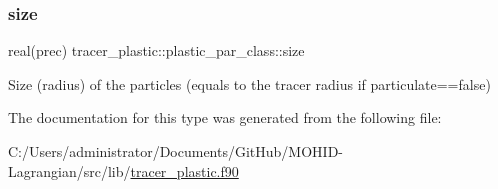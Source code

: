 \mbox{\label{structtracer__plastic_1_1plastic__par__class_ae7f5294e339ec13e0d5f0213fe66e026}} 
\subsubsection{\texorpdfstring{size}{size}}
{\footnotesize\ttfamily real(prec) tracer\+\_\+plastic\+::plastic\+\_\+par\+\_\+class\+::size\hspace{0.3cm}{\ttfamily [private]}}



Size (radius) of the particles (equals to the tracer radius if particulate==false) 



The documentation for this type was generated from the following file\+:\begin{DoxyCompactItemize}
\item 
C\+:/\+Users/administrator/\+Documents/\+Git\+Hub/\+M\+O\+H\+I\+D-\/\+Lagrangian/src/lib/\hyperlink{tracer__plastic_8f90}{tracer\+\_\+plastic.\+f90}\end{DoxyCompactItemize}
